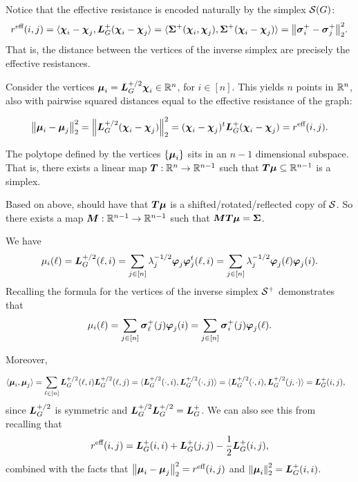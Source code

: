 Notice that the effective resistance is encoded naturally by the simplex $\mathcal{S}(G)$: 
\[r^{\text{eff}}(i,j) = \langle \boldsymbol{\chi}_i-\boldsymbol{\chi}_j,\vb*{L}_G^+(\boldsymbol{\chi}_i-\boldsymbol{\chi}_j\rangle = \langle \boldsymbol{\Sigma}^+(\boldsymbol{\chi}_i,\boldsymbol{\chi}_j),\boldsymbol{\Sigma}^+(\boldsymbol{\chi}_i-\boldsymbol{\chi}_j)\rangle = \norm{\vb*{\sigma}_i^+-\vb*{\sigma}_j^+}_2^2.\]
That is, the distance between the vertices of the inverse simplex are precisely the effective resistances. 


Consider the vertices $\vb*{\mu}_i=\vb*{L}_G^{+/2}\boldsymbol{\chi}_i\in\mathbb{R}^n$, for $i\in[n]$. This yields $n$ points in $\mathbb{R}^n$, also with pairwise squared distances equal to the effective resistance of the graph: 

\begin{equation*}
    \norm{\vb*{\mu}_i-\vb*{\mu}_j}_2^2 = \norm{\vb*{L}_G^{+/2}(\boldsymbol{\chi}_i-\boldsymbol{\chi}_j)}_2^2 =  (\boldsymbol{\chi}_i-\boldsymbol{\chi}_j)^t \vb*{L}_G^+(\boldsymbol{\chi}_i-\boldsymbol{\chi}_j)=r^{\text{eff}}(i,j).
\end{equation*}

\begin{claim}
 The polytope defined by the vertices $\{\vb*{\mu}_i\}$ sits in an $n-1$ dimensional subspace. That  is, there exists a linear map $\vb*{T}:\mathbb{R}^n\to\mathbb{R}^{n-1}$ such that $\vb*{T}\vb*{\mu}\subseteq\mathbb{R}^{n-1}$ is a simplex.
\end{claim}

Based on above, should have  that $\vb*{T}\vb*{\mu}$ is a shifted/rotated/reflected copy of $\mathcal{S}$. So there exists a map ${\vb*{M}}:\mathbb{R}^{n-1}\to\mathbb{R}^{n-1}$ such that ${\vb*{M}}\vb*{T}\vb*{\mu}=\boldsymbol{\Sigma}$. 

We have 
\begin{align*}
    \mu_i(\ell) = \vb*{L}_G^{+/2}(\ell,i) = \sum_{j\in[n]}\lambda_j^{-1/2}\vb*{\varphi}_j\vb*{\varphi}_j^t(\ell,i) = \sum_{j\in[n]}\lambda_j^{-1/2}\vb*{\varphi}_j(\ell)\vb*{\varphi}_j(i).
\end{align*}
Recalling the formula for the vertices of the inverse simplex $\mathcal{S}^+$ demonstrates that 
\begin{equation*}
    \mu_i(\ell) = \sum_{j\in[n]}\vb*{\sigma}_\ell^+(j)\vb*{\varphi}_j(i) = \sum_{j\in[n]}\vb*{\sigma}_i^+(j)\vb*{\varphi}_j(\ell).
\end{equation*}

Moreover,

\begin{align*}
    \langle \vb*{\mu}_i,\vb*{\mu}_j\rangle &=\sum_{\ell\in[n]} \vb*{L}_G^{+/2}(\ell,i)\vb*{L}_G^{+/2}(\ell,j) = \langle \vb*{L}_G^{+/2}(\cdot,i),\vb*{L}_G^{+/2}(\cdot,j)\rangle =\langle \vb*{L}_G^{+/2}(\cdot,i),\vb*{L}_G^{+/2}(j,\cdot)\rangle= \vb*{L}_G^+(i,j),
\end{align*}
since $\vb*{L}_G^{+/2}$ is symmetric and  $\vb*{L}_G^{+/2}\vb*{L}_G^{+/2}=\vb*{L}_G^+$.  We can also see this from recalling that 
\[r^{\text{eff}}(i,j) = \vb*{L}_G^+(i,i) + \vb*{L}_G^+(j,j) - \frac{1}{2}\vb*{L}_G^+(i,j),\]
combined with the facts that $\norm{\vb*{\mu}_i-\vb*{\mu}_j}_2^2 = r^{\text{eff}}(i,j)$ and $\norm{\vb*{\mu}_i}_2^2 = \vb*{L}_G^+(i,i)$. 



